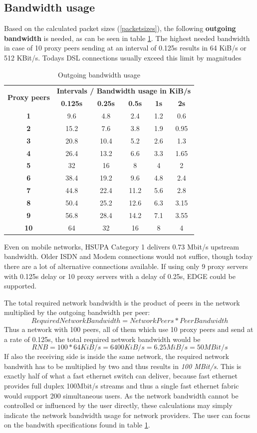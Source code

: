 \subsection{Bandwidth usage}
Based on the calculated packet sizes (\ref{packetsizes}), 
the following \textbf{outgoing bandwidth}
is needed, as can be seen in table \ref{bandwidth}.
The highest needed bandwidth
in case of 10 proxy peers sending at an interval of 0.125s results in 64 KiB/s
or 512 KBit/s. Todays DSL connections usually exceed this limit by magnitudes
\begin{longtable}{|c|c|c|c|c|c|}
\caption{Outgoing bandwidth usage}
\label{bandwidth}\\
\hline
\multirow{2}{*}{\textbf{Proxy peers}} & \multicolumn{5}{|l|}{\textbf{Intervals / Bandwidth usage in KiB/s}} \\
& \textbf{0.125s} & \textbf{0.25s} & \textbf{0.5s} & \textbf{1s} & \textbf{2s}\\
\hline
\textbf{1} & 9.6 & 4.8 & 2.4 & 1.2 & 0.6\\
\hline
\textbf{2} & 15.2 & 7.6 & 3.8 & 1.9 & 0.95\\
\hline
\textbf{3} & 20.8 & 10.4 & 5.2 & 2.6 & 1.3\\
\hline
\textbf{4} & 26.4 & 13.2 & 6.6 & 3.3 & 1.65\\
\hline
\textbf{5} & 32 & 16 & 8 & 4 & 2\\
\hline
\textbf{6} & 38.4 & 19.2 & 9.6 & 4.8 & 2.4\\
\hline
\textbf{7} & 44.8 & 22.4 & 11.2 & 5.6 & 2.8\\
\hline
\textbf{8} & 50.4 & 25.2 & 12.6 & 6.3 & 3.15\\
\hline
\textbf{9} & 56.8 & 28.4 & 14.2 & 7.1 & 3.55\\
\hline
\textbf{10} & 64 & 32 & 16 & 8 & 4\\
\hline
\end{longtable}
Even on mobile networks, HSUPA Category 1 delivers 0.73 Mbit/s upstream bandwidth.
Older ISDN and Modem connections would not suffice, though
today there are a lot of alternative connections available.\cite{wiki:bitrates}
If using only 9 proxy servers with 0.125s delay or
10 proxy servers with a delay of 0.25s, EDGE could be supported.

The total required network bandwidth is the product of peers in the
network multiplied by the outgoing bandwidth per peer:
$$Required Network Bandwidth = Network Peers * Peer Bandwidth$$
Thus a network with 100 peers, all of them which use 10 proxy peers
and send at a rate of 0.125s, the total required network bandwidth would be
$$RNB = 100 * 64 KiB/s = 6400 KiB/s = 6.25MiB/s = 50 MBit/s$$
If also the receiving side is inside the same network, the required network
bandwith has to be multiplied by two and thus results in 
\textit{100 MBit/s}. This is exactly half of what a fast ethernet switch
can deliver, because fast ethernet provides full duplex 100Mbit/s streams
and thus a single fast ethernet fabric would support 200 simultaneous users.
As the network bandwidth cannot be controlled or influenced by the user
directly, these calculations may simply indicate the network bandwidth
usage for network providers. The user can focus on the bandwith specifications
found in table \ref{bandwidth}.

